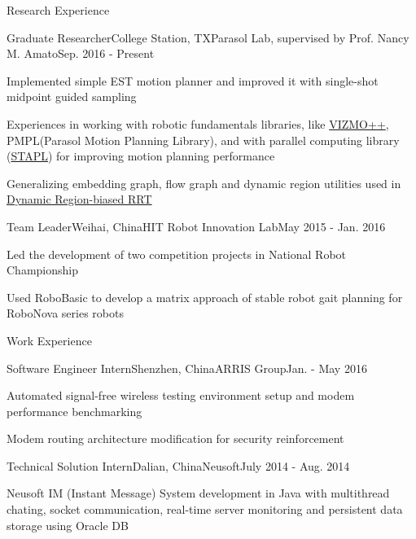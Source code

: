 \documentclass{resume} %
\begin{document}

\begin{rSection}{Research Experience}
\begin{rSubsection}{Graduate Researcher}{College Station, TX}{Parasol Lab, supervised by Prof. Nancy M. Amato}{Sep. 2016 - Present}
\item Implemented simple EST motion planner and improved it with single-shot midpoint guided sampling
\item Experiences in working with robotic fundamentals libraries, like \href{https://parasol.tamu.edu/groups/amatogroup/research/UserGuided/Old/vizmo++/}{VIZMO++}, PMPL(Parasol Motion Planning Library), and with parallel computing library (\href{https://parasol.tamu.edu/groups/rwergergroup/research/stapl/}{STAPL}) for improving motion planning performance
\item Generalizing embedding graph, flow graph and dynamic region utilities used in \href{http://wafr2016.berkeley.edu/papers/WAFR_2016_paper_36.pdf}{Dynamic Region-biased RRT}
\end{rSubsection}

\begin{rSubsection}{Team Leader}{Weihai, China}{HIT Robot Innovation Lab}{May 2015 - Jan. 2016}
\item Led the development of two competition projects in National Robot Championship
\item Used RoboBasic to develop a matrix approach of stable robot gait planning for RoboNova series robots
\end{rSubsection}

\end{rSection}

\begin{rSection}{Work Experience}
\begin{rSubsection}{Software Engineer Intern}{Shenzhen, China}{ARRIS Group}{Jan. - May 2016}
\item Automated signal-free wireless testing environment setup and modem performance benchmarking
\item Modem routing architecture modification for security reinforcement
\end{rSubsection}

\begin{rSubsection}{Technical Solution Intern}{Dalian, China}{Neusoft}{July 2014 - Aug. 2014}
\item Neusoft IM (Instant Message) System development in Java with multithread chating, socket communication, real-time server monitoring and persistent data storage using Oracle DB
\end{rSubsection}
\end{rSection}
\end{document}
